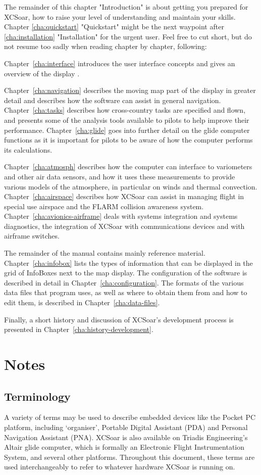 The remainder of this chapter "Introduction" is about getting you prepared for 
XCSoar, how to raise your level of understanding and maintain your skills. 
Chapter \ref{cha:quickstart} "Quickstart" might be the next waypoint after 
\ref{cha:installation} "Installation" for the urgent user. Feel free to cut 
short, but do not resume too sadly when reading chapter by chapter, following:

Chapter~\ref{cha:interface} introduces the user interface
concepts and gives an overview of the display .

Chapter~\ref{cha:navigation} describes the moving map part of the
display in greater detail and describes how the software can assist in
general navigation.  Chapter~\ref{cha:tasks} describes how
cross-country tasks are specified and flown, and presents some of the
analysis tools available to pilots to help improve their performance.
Chapter~\ref{cha:glide} goes into further detail on the glide computer
functions as it is important for pilots to be aware of how the
computer performs its calculations.

Chapter~\ref{cha:atmosph} describes how the computer can interface to
variometers and other air data sensors, and how it uses these
measurements to provide various models of the atmosphere, in
particular on winds and thermal convection.
Chapter~\ref{cha:airspace} describes how XCSoar can assist in managing
flight in special use airspace and the FLARM collision awareness
system.  Chapter~\ref{cha:avionics-airframe} deals with systems
integration and systems diagnostics, the integration of XCSoar with
communications devices and with airframe switches.

The remainder of the manual contains mainly reference material.
Chapter~\ref{cha:infobox} lists the types of information that can be
displayed in the grid of InfoBoxes next to the map display.  The
configuration of the software is described in detail in
Chapter~\ref{cha:configuration}.  The formats of the various data
files that program uses, as well as where to obtain them from and how
to edit them, is described in Chapter~\ref{cha:data-files}.

Finally, a short history and discussion of XCSoar's development
process is presented in Chapter~\ref{cha:history-development}.

\section{Notes}

\subsection*{Terminology}
A variety of terms may be used to describe embedded devices like the Pocket PC
platform, including `organiser', Portable Digital Assistant (PDA)
and Personal Navigation Assistant (PNA).  XCSoar is
also available on Triadis Engineering's Altair glide computer, which is
formally an Electronic Flight Instrumentation System, and several other
platforms. Throughout this document, these terms are used interchangeably to
refer to whatever hardware XCSoar is running on.

